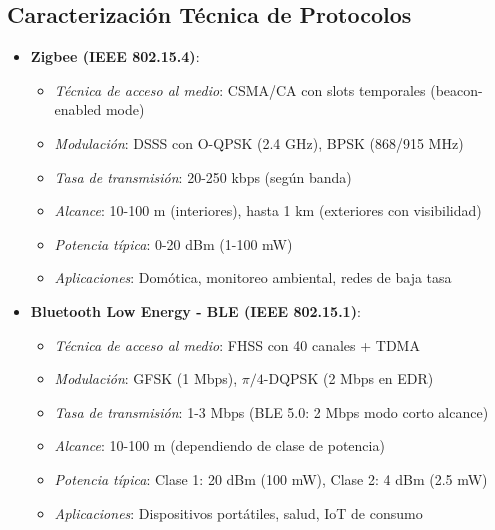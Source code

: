 \subsection*{Caracterización Técnica de Protocolos}
\begin{itemize}
    \item \textbf{Zigbee (IEEE 802.15.4)}:
        \begin{itemize}
            \item \textit{Técnica de acceso al medio}: CSMA/CA con slots temporales (beacon-enabled mode)
            \item \textit{Modulación}: DSSS con O-QPSK (2.4 GHz), BPSK (868/915 MHz)
            \item \textit{Tasa de transmisión}: 20-250 kbps (según banda)
            \item \textit{Alcance}: 10-100 m (interiores), hasta 1 km (exteriores con visibilidad)
            \item \textit{Potencia típica}: 0-20 dBm (1-100 mW)
            \item \textit{Aplicaciones}: Domótica, monitoreo ambiental, redes de baja tasa \cite{gerenciatecnologicainformatica2013}
        \end{itemize}
    
    \item \textbf{Bluetooth Low Energy - BLE (IEEE 802.15.1)}:
        \begin{itemize}
            \item \textit{Técnica de acceso al medio}: FHSS con 40 canales + TDMA
            \item \textit{Modulación}: GFSK (1 Mbps), $\pi/4$-DQPSK (2 Mbps en EDR)
            \item \textit{Tasa de transmisión}: 1-3 Mbps (BLE 5.0: 2 Mbps modo corto alcance)
            \item \textit{Alcance}: 10-100 m (dependiendo de clase de potencia)
            \item \textit{Potencia típica}: Clase 1: 20 dBm (100 mW), Clase 2: 4 dBm (2.5 mW)
            \item \textit{Aplicaciones}: Dispositivos portátiles, salud, IoT de consumo \cite{Collotta2017}
        \end{itemize}
    

\end{itemize}
